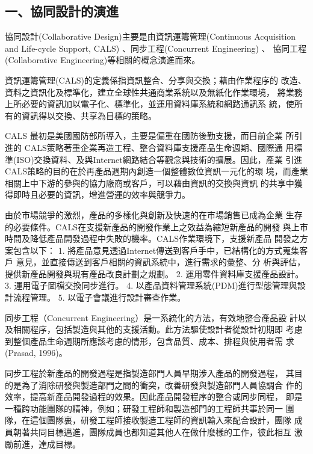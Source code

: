 \documentclass[]{article}
\begin{document}
\subsection{一、協同設計的演進}\label{ux4e00ux5354ux540cux8a2dux8a08ux7684ux6f14ux9032}

協同設計(Collaborative Design)主要是由資訊運籌管理(Continuous
Acquisition and Life-cycle Support, CALS) 、同步工程(Concurrent
Engineering) 、 協同工程(Collaborative
Engineering)等相關的概念演進而來。

資訊運籌管理(CALS)的定義係指資訊整合、分享與交換；藉由作業程序的
改造、資料之資訊化及標準化，建立全球性共通商業系統以及無紙化作業環境，
將業務上所必要的資訊加以電子化、標準化，並運用資料庫系統和網路通訊系
統，使所有的資訊得以交換、共享為目標的策略。

CALS 最初是美國國防部所導入，主要是偏重在國防後勤支援，而目前企業
所引進的 CALS策略著重企業再造工程、整合資料庫支援產品生命週期、國際通
用標準(ISO)交換資料、及與Internet網路結合等觀念與技術的擴展。因此，產業
引進 CALS策略的目的在於再產品週期內創造一個整體數位資訊一元化的環
境，而產業相關上中下游的參與的協力廠商或客戶，可以藉由資訊的交換與資訊
的共享中獲得即時且必要的資訊，增進營運的效率與競爭力。

由於市場競爭的激烈，產品的多樣化與創新及快速的在市場銷售已成為企業
生存的必要條件。CALS在支援新產品的開發作業上之效益為縮短新產品的開發
與上市時間及降低產品開發過程中失敗的機率。CALS作業環境下，支援新產品
開發之方案包含以下： 1.
將產品意見透過Internet傳送到客戶手中，已結構化的方式蒐集客戶
意見，並直接傳送到客戶相關的資訊系統中，進行需求的彙整、分
析與評估，提供新產品開發與現有產品改良計劃之規劃。 2.
運用零件資料庫支援產品設計。 3. 運用電子圖檔交換同步進行。 4.
以產品資料管理系統(PDM)進行型態管理與設計流程管理。 5.
以電子會議進行設計審查作業。

同步工程（Concurrent Engineering）是一系統化的方法，有效地整合產品設
計以及相關程序，包括製造與其他的支援活動。此方法驅使設計者從設計初期即
考慮到整個產品生命週期所應該考慮的情形，包含品質、成本、排程與使用者需
求(Prasad, 1996)。

同步工程於新產品的開發過程是指製造部門人員早期涉入產品的開發過程，
其目的是為了消除研發與製造部門之間的衝突，改善研發與製造部門人員協調合
作的效率，提高新產品開發過程的效果。因此產品開發程序的整合或同步同程，
即是一種跨功能團隊的精神，例如；研發工程師和製造部門的工程師共事於同一
團隊，在這個團隊裏，研發工程師接收製造工程師的資訊輸入來配合設計，團隊
成員朝著共同目標邁進，團隊成員也都知道其他人在做什麼樣的工作，彼此相互
激勵前進，達成目標。
\end{document}
